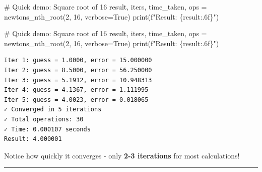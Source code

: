 \documentclass[
  letterpaper,
  DIV=11,
  numbers=noendperiod]{scrartcl}
\newenvironment{Shaded}{\begin{snugshade}}{\end{snugshade}}
\newcommand{\BuiltInTok}[1]{\textcolor[rgb]{0.00,0.23,0.31}{#1}}
\newcommand{\CommentTok}[1]{\textcolor[rgb]{0.37,0.37,0.37}{#1}}
\newcommand{\DecValTok}[1]{\textcolor[rgb]{0.68,0.00,0.00}{#1}}
\newcommand{\NormalTok}[1]{\textcolor[rgb]{0.00,0.23,0.31}{#1}}
\newcommand{\OperatorTok}[1]{\textcolor[rgb]{0.37,0.37,0.37}{#1}}
\newcommand{\SpecialCharTok}[1]{\textcolor[rgb]{0.37,0.37,0.37}{#1}}
\newcommand{\SpecialStringTok}[1]{\textcolor[rgb]{0.13,0.47,0.30}{#1}}
\newcommand{\VariableTok}[1]{\textcolor[rgb]{0.07,0.07,0.07}{#1}}
\begin{document}
\begin{Shaded}
\begin{Highlighting}[]
\CommentTok{\# Quick demo: Square root of 16}
\NormalTok{result, iters, time\_taken, ops }\OperatorTok{=}\NormalTok{ newtons\_nth\_root(}\DecValTok{2}\NormalTok{, }\DecValTok{16}\NormalTok{, verbose}\OperatorTok{=}\VariableTok{True}\NormalTok{)}
\BuiltInTok{print}\NormalTok{(}\SpecialStringTok{f"Result: }\SpecialCharTok{\{}\NormalTok{result}\SpecialCharTok{:.6f\}}\SpecialStringTok{"}\NormalTok{)}
\end{Highlighting}
\end{Shaded}

\begin{Shaded}
\begin{Highlighting}[]
\CommentTok{\# Quick demo: Square root of 16}
\NormalTok{result, iters, time\_taken, ops }\OperatorTok{=}\NormalTok{ newtons\_nth\_root(}\DecValTok{2}\NormalTok{, }\DecValTok{16}\NormalTok{, verbose}\OperatorTok{=}\VariableTok{True}\NormalTok{)}
\BuiltInTok{print}\NormalTok{(}\SpecialStringTok{f"Result: }\SpecialCharTok{\{}\NormalTok{result}\SpecialCharTok{:.6f\}}\SpecialStringTok{"}\NormalTok{)}
\end{Highlighting}
\end{Shaded}

\begin{verbatim}
Iter 1: guess = 1.0000, error = 15.000000
Iter 2: guess = 8.5000, error = 56.250000
Iter 3: guess = 5.1912, error = 10.948313
Iter 4: guess = 4.1367, error = 1.111995
Iter 5: guess = 4.0023, error = 0.018065
✓ Converged in 5 iterations
✓ Total operations: 30
✓ Time: 0.000107 seconds
Result: 4.000001
\end{verbatim}

\begin{tcolorbox}[enhanced jigsaw, left=2mm, opacityback=0, breakable, toptitle=1mm, arc=.35mm, opacitybacktitle=0.6, colframe=quarto-callout-tip-color-frame, colback=white, coltitle=black, bottomrule=.15mm, title=\textcolor{quarto-callout-tip-color}{\faLightbulb}\hspace{0.5em}{Key Observation}, colbacktitle=quarto-callout-tip-color!10!white, bottomtitle=1mm, leftrule=.75mm, toprule=.15mm, rightrule=.15mm, titlerule=0mm]

Notice how quickly it converges - only {\textbf{2-3 iterations}} for
most calculations!

\end{tcolorbox}

\begin{center}\rule{0.5\linewidth}{0.5pt}\end{center}
\end{document}
